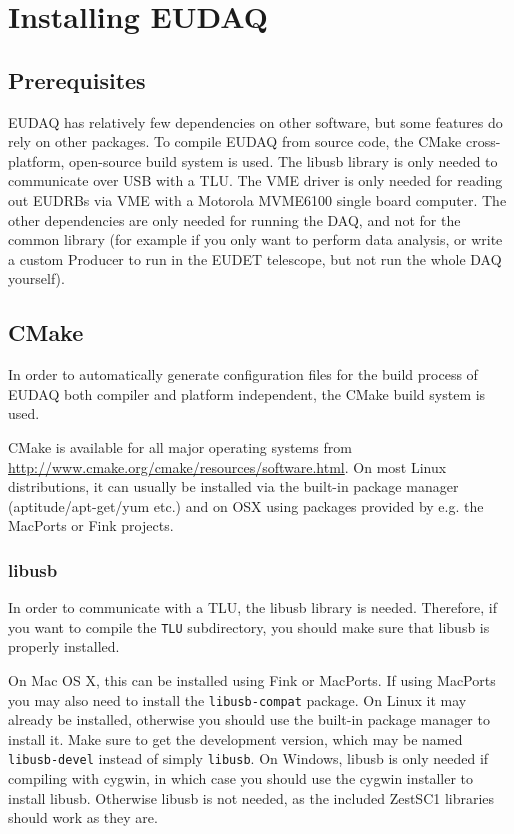 \section{Installing EUDAQ}

\subsection{Prerequisites}
EUDAQ has relatively few dependencies on other software, but some
features do rely on other packages.
To compile EUDAQ from source code, the CMake cross-platform, open-source build system is used.
The libusb library is only needed to communicate over USB with a \gls{TLU}\cite{Cussans2009}.
The VME driver is only needed for reading out \glspl{EUDRB}\cite{Cotta2008}
via VME with a Motorola MVME6100 single board computer.
The other dependencies are only needed for running the DAQ, and not for the common library
(for example if you only want to perform data analysis,
or write a custom Producer to run in the EUDET telescope,
but not run the whole DAQ yourself).

\subsection{CMake}
In order to automatically generate configuration files for the build
process of EUDAQ both compiler and platform independent, the CMake
build system is used.

CMake is available for all major operating systems from
\url{http://www.cmake.org/cmake/resources/software.html}. On most
Linux distributions, it can usually be installed via the built-in
package manager (aptitude/apt-get/yum etc.) and on OSX using
packages provided by e.g. the MacPorts or Fink projects.

\subsubsection{libusb}
In order to communicate with a \gls{TLU}, the libusb library is needed.
Therefore, if you want to compile the \texttt{TLU} subdirectory, you should make sure that libusb is properly installed.

On Mac OS X, this can be installed using Fink or MacPorts.
If using MacPorts you may also need to install the \texttt{libusb-compat} package.
On Linux it may already be installed,
otherwise you should use the built-in package manager to install it.
Make sure to get the development version, which may be named \texttt{libusb-devel} instead of simply \texttt{libusb}.
On Windows, libusb is only needed if compiling with cygwin,
in which case you should use the cygwin installer to install libusb.
Otherwise libusb is not needed, as the included ZestSC1 libraries should work as they are.


